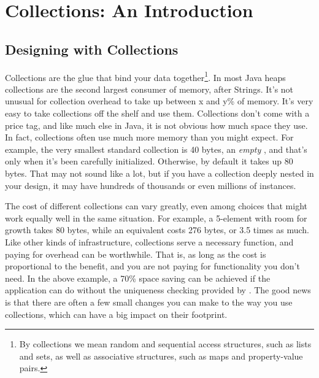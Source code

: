 \chapter{Collections: An Introduction}
\label{chapter:brief-introduction-collections}

\section{Designing with Collections}
Collections are the glue that bind your data together\footnote{By
collections we mean random and sequential access structures, such as lists and
sets, as well as associative structures, such as maps and property-value pairs.}. 
In most Java heaps collections are the second largest consumer of memory,
after Strings.  It's not unusual for collection overhead to take up between
x and y\% of memory. It's very easy to take collections off the shelf
and use them. Collections don't come with a price tag, and like much else
in Java, it is not obvious how much space they use. In fact,
collections often use much more memory than you might expect. For example,
the very smallest standard collection is 40 bytes, an \emph{empty}
, and that's only when it's been carefully initialized. 
Otherwise, by default it takes up 80 bytes. That may not sound like a lot,
but if you have a collection deeply nested in your design, it may have hundreds
of thousands or even millions of instances.

The cost of different collections can vary greatly, even among choices that
might work equally well in the same situation. For example, a 5-element 
with room for growth takes 80 bytes, while an equivalent  costs 276 bytes, or 3.5 times as much. 
Like other kinds of infrastructure, collections serve a necessary
function, and paying for overhead can be worthwhile.  That is, as long as
the cost is proportional to the benefit, and you are not paying
for functionality you don't need. In the above example, a 70\% space saving
can be achieved if the application can do without the uniqueness checking
provided by .  The good news is that there are often a few small
changes you can make to the way you use collections, which can have a big
impact on their footprint.


